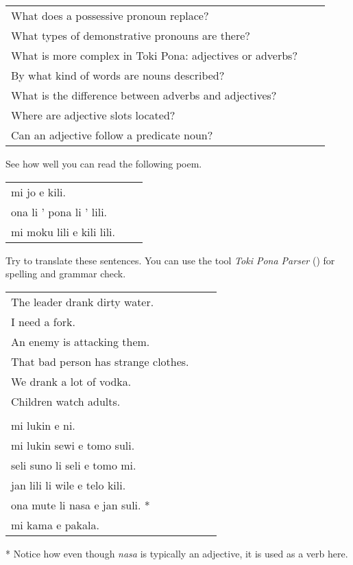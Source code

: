 \begin{supertabular}{p{5,5cm}|ll}
What does a possessive pronoun replace? &&  \\ %
What types of demonstrative pronouns are there? &&  \\ %
What is more complex in Toki Pona: adjectives or adverbs? &&  \\ %
By what kind of words are nouns described? &&   \\ %
What is the difference between adverbs and adjectives? &&  \\ %
Where are adjective slots located? &&  \\ %
Can an adjective follow a predicate noun? &&  \\ %
\end{supertabular}

See how well you can read the following poem. 

\begin{supertabular}{p{5,5cm}|ll}
mi jo e kili. && \\ %
ona li ' pona li ' lili. && \\ %
mi moku lili e kili lili. && \\ %
\end{supertabular} 

Try to translate these sentences. 
You can use the tool \textit{Toki Pona Parser} (\cite{www:rowa:02}) for spelling and grammar check. 

\begin{supertabular}{p{5,5cm}|ll}
The leader drank dirty water. &&   \\ %
I need a fork.   &&   \\ %
An enemy is attacking them.   &&   \\ %
That bad person has strange clothes.   &&  \\  %
We drank a lot of vodka.   &&   \\ %
Children watch adults.   &&   \\ %
 && \\ %
mi lukin e ni. &&  \\ %
mi lukin sewi e tomo suli.  &&    \\ %
seli suno li seli e tomo mi.  &&   \\ %
jan lili li wile e telo kili.  &&  \\ %
ona mute li nasa e jan suli. * &&  \\ %
mi kama e pakala. &&  \\ %
\end{supertabular} 

* Notice how even though \textit{nasa} is typically an adjective, it is used as a verb here. 
